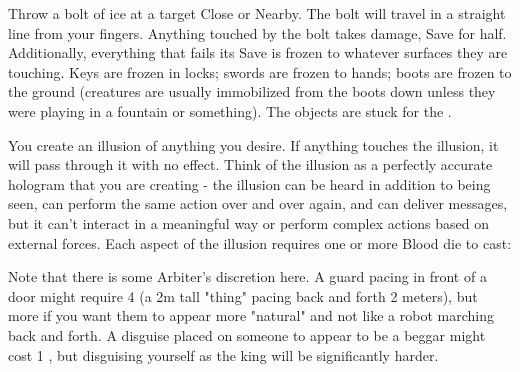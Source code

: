 \WIZARDRY[
  Name=Icebolt,
  Link=secrets-icebolt,
  Alignment=Elements,
  Save=Y (half),
  Duration=\DICE,
  Counter=None ,
  Keywords=None,
  Target=Close or Nearby point (straight line)
]

Throw a bolt of ice at a target Close or Nearby.  The bolt will travel in a straight line from your fingers.  Anything touched by the bolt takes
\SUMDICE damage, Save for half.  Additionally, everything that fails its Save is frozen to whatever surfaces they are touching.  Keys are frozen in
locks; swords are frozen to hands; boots are frozen to the ground (creatures are usually immobilized from the boots down unless they were
playing in a fountain or something).  The objects are stuck for the \Duration.

\WIZARDRY[
  Name=Illusion,
  Link=secrets-illusion,
  Alignment=Mind,
  Save=N,
  Duration=Varies,
  Counter=\mylink{Ego Weapon}{secrets-ego-weapon} ,
  Keywords=None,
  Target=Varies
]

You create an illusion of anything you desire. If anything touches the illusion, it will pass through it with no effect.  Think of the illusion as a perfectly accurate hologram that you are creating - the illusion can be
heard in addition to being seen, can perform the same action over and over again, and can deliver messages, but it can't interact in a meaningful way
or perform complex actions based on external forces. Each aspect of the illusion requires one or more Blood die to cast:


Note that there is some Arbiter's discretion here.  A guard pacing in front of a door might require 4 \DICE (a 2m tall "thing" pacing back and forth 2 meters), but more if you want them to appear more "natural" and not like a robot marching back and forth.  A disguise placed on someone to appear to be a beggar might cost 1 \DICE, but disguising yourself as the king will be significantly harder.

